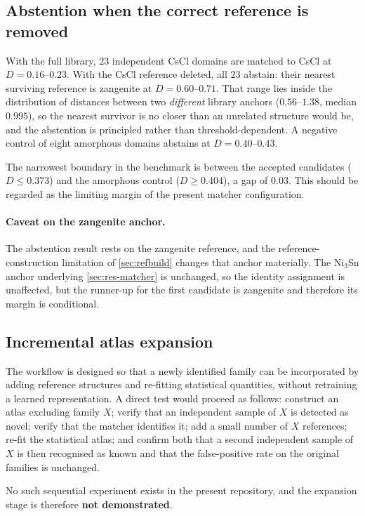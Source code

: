 \subsection{Abstention when the correct reference is removed}
\label{sec:res-abstain}

With the full library, $23$ independent CsCl domains are matched to CsCl at
$D = 0.16$--$0.23$. With the CsCl reference deleted, all $23$ abstain: their nearest
surviving reference is zangenite at $D = 0.60$--$0.71$. That range lies inside the
distribution of distances between two \emph{different} library anchors
($0.56$--$1.38$, median $0.995$), so the nearest survivor is no closer than an unrelated
structure would be, and the abstention is principled rather than threshold-dependent. A
negative control of eight amorphous domains abstains at $D = 0.40$--$0.43$.

The narrowest boundary in the benchmark is between the accepted candidates
($D \le 0.373$) and the amorphous control ($D \ge 0.404$), a gap of $0.03$. This should be
regarded as the limiting margin of the present matcher configuration.

\paragraph{Caveat on the zangenite anchor.} The abstention result rests on the zangenite
reference, and the reference-construction limitation of \cref{sec:refbuild} changes that
anchor materially. The Ni$_3$Sn anchor underlying \cref{sec:res-matcher} is unchanged, so
the identity assignment is unaffected, but the runner-up for the first candidate is
zangenite and therefore its margin is conditional.

\subsection{Incremental atlas expansion}
\label{sec:res-expand}

The workflow is designed so that a newly identified family can be incorporated by adding
reference structures and re-fitting statistical quantities, without retraining a learned
representation. A direct test would proceed as follows: construct an atlas excluding family
$X$; verify that an independent sample of $X$ is detected as novel; verify that the matcher
identifies it; add a small number of $X$ references; re-fit the statistical atlas; and
confirm both that a second independent sample of $X$ is then recognised as known and that
the false-positive rate on the original families is unchanged.

No such sequential experiment exists in the present repository, and the expansion stage is
therefore \textbf{not demonstrated}.
